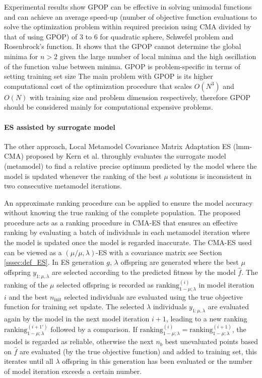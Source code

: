 Experimental results show GPOP can be effective in solving unimodal functions and can achieve an average speed-up (number of objective function evaluations to solve the optimization problem within required precision using CMA divided by that of using GPOP) of 3 to 6 for quadratic sphere, Schwefel problem and Rosenbrock's function. It shows that the GPOP cannot determine the global minima for $n>2$ given the large number of local minima and the high oscillation of the function value between minima. GPOP is problem-specific in terms of setting training set size 
The main problem with GPOP is its higher computational cost of the optimization procedure that scales $O(N^3)$ and $O(N)$ with training size and problem dimension respectively, therefore GPOP should be considered mainly for computational expensive problems.



\paragraph{ES assisted by surrogate model}
The other approach, Local Metamodel Covariance Matrix Adaptation ES (lmm-CMA) proposed by Kern et al. \cite{10.1007/11844297_95} throughly evaluates the surrogate model (metamodel) to find a relative precise optimum predicted by the model where the model is updated whenever the ranking of the best $\mu$ solutions is inconsistent in two consecutive metamodel iterations.

An approximate ranking procedure can be applied to ensure the model accuracy without knowing the true ranking of the complete population. The proposed procedure acts as a ranking procedure in CMA-ES that ensures an effective ranking by evaluating a batch of individuals in each metamodel iteration where the model is updated once the model is regarded inaccurate. The CMA-ES used can be viewed as a $(\mu/\mu,\lambda)$-ES with a covariance matrix see Section \ref{sssec:def_ES}. In ES generation $g$, $\lambda$ offspring are generated where the best $\mu$ offspring $y_{1:\mu,\lambda}$ are selected according to the predicted fitness by the model $\hat f$. The ranking of the $\mu$ selected offspring is recorded as $\text{ranking}_{1-\mu;\lambda}^{(i)}$ in model iteration $i$ and the best $n_{\text{init}}$ selected individuals are evaluated using the true objective function for training set update. The selected $\lambda$ individuals $y_{1:\mu,\lambda}$ are evaluated again by the model in the next model iteration $i+1$, leading to a new ranking $\text{ranking}_{1-\mu;\lambda}^{(i+1 \prime)}$ followed by a comparison. If $\text{ranking}_{1-\mu;\lambda}^{(i)} = \text{ranking}_{1-\mu;\lambda}^{(i+1)}$, the model is regarded as reliable, otherwise the next $n_b$ best unevaluated points based on $\hat f$ are evaluated (by the true objective function) and added to training set, this iterates until all $\lambda$ offspring in this generation has been evaluated or the number of model iteration exceeds a certain number.  

